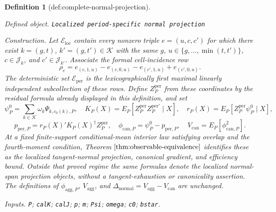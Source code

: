 \documentclass{article}
\newtheorem{definition}{Definition}
\begin{document}
\begin{definition}[def:complete-normal-projection]\label{def:complete-normal-projection}
\par\smallskip\noindent\emph{Defined object.} \texttt{Localized period-\allowbreak{}specific normal projection}
\par\smallskip\noindent\emph{Construction.} Let \(\mathscr E_{\mathrm{loc}}\) contain every nonzero triple \(e=(u,c,c')\) for which there exist \(k=(g,t)\), \(k'=(g,t')\in\mathcal K\) with the same \(g\), \(u\in\{g,\ldots,\min(t,t')\}\), \(c\in\mathcal J_k\), and \(c'\in\mathcal J_{k'}\).  Associate the formal cell-incidence row
\[
\rho_e=e_{(c,1,u)}-e_{(c,0,u)}-e_{(c',1,u)}+e_{(c',0,u)}.
\]
The deterministic set \(\mathcal E_{\mathrm{per}}\) is the lexicographically first maximal linearly independent subcollection of these rows.  Define \(Z_P^{\mathrm{per}}\) from these coordinates by the residual formula already displayed in this definition, and set
\[
\psi_P^0=\sum_{k\in\mathcal K}\omega_k\Psi_{k,c_0(k),P},\quad
K_P(X)=E_P[Z_P^{\mathrm{per}}Z_P^{\mathrm{per}\prime}\mid X],\quad
r_P(X)=E_P[Z_P^{\mathrm{per}}\psi_P^0\mid X],
\]
\[
p_{\mathrm{per},P}=r_P(X)'K_P(X)^\dagger Z_P^{\mathrm{per}},\quad
\phi_{\mathrm{can},P}=\psi_P^0-p_{\mathrm{per},P},\quad
V_{\mathrm{can}}=E_P[\phi_{\mathrm{can},P}^2].
\]
At a fixed finite-support conditional-mean interior law satisfying overlap and the fourth-moment condition, Theorem \(\ref{thm:observable-equivalence}\) identifies these as the localized tangent-normal projection, canonical gradient, and efficiency bound.  Outside that proved regime the same formulas denote the localized normal-span projection objects, without a tangent-exhaustion or canonicality assertion.  The definitions of \(\phi_{\mathrm{agg},P}\), \(V_{\mathrm{agg}}\), and \(\Delta_{\mathrm{normal}}=V_{\mathrm{agg}}-V_{\mathrm{can}}\) are unchanged.
\par\smallskip\noindent\emph{Inputs.} \texttt{P}; \texttt{calK}; \texttt{calJ}; \texttt{p}; \texttt{m}; \texttt{Psi}; \texttt{omega}; \texttt{c0}; \texttt{bstar}.
\end{definition}
\end{document}
